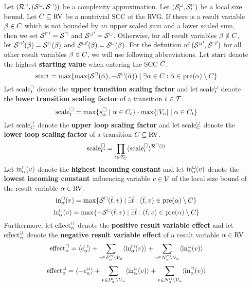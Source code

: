 \begin{theorem}
  Let $({\mathcal{R}^\sqcap}, {({\mathcal{S}^\sqcup}, {\mathcal{S}^\sqcap})})$ be a complexity approximation.
  Let ${({\mathcal{S}^\sqcup_l}, {\mathcal{S}^\sqcap_l})}$ be a local size bound.
  Let $C \subseteq \text{RV}$ be a nontrivial SCC of the RVG.
  If there is a result variable $\beta \in C$ which is not bounded by an upper scaled sum and a lower scaled sum, then we set ${\mathcal{S}^\sqcap}' = {\mathcal{S}^\sqcap}$ and ${\mathcal{S}^\sqcup}' = {\mathcal{S}^\sqcup}$.
  Otherwise, for all result variables $\beta \notin C$, let ${\mathcal{S}^\sqcap}'(\beta) = {\mathcal{S}^\sqcap}(\beta)$ and ${\mathcal{S}^\sqcup}'(\beta) = {\mathcal{S}^\sqcup}(\beta)$.
  For the definition of $({\mathcal{S}^\sqcup}', {\mathcal{S}^\sqcap}')$ for all other result variables $\beta \in C$, we will use following abbreviations.
  Let $\text{start}$ denote the highest \textbf{starting value} when entering the SCC $C$.
  \[ \text{start} = \max \lbrace \max({\mathcal{S}^\sqcap}(\tilde{\alpha}), -{\mathcal{S}^\sqcup}(\tilde{\alpha})) \mid \exists \alpha \in C: \tilde{\alpha} \in \text{pre}(\alpha) \setminus C \rbrace \]
  Let $\text{scale}^\sqcap_t$ denote the \textbf{upper transition scaling factor} and let $\text{scale}^\sqcup_t$ denote the \textbf{lower transition scaling factor} of a transition $t \in \mathcal{T}$.
  \[ \text{scale}^\square_t = \max \lbrace s^\square_{\alpha} \mid \alpha \in C_t \rbrace \cdot \max \lbrace \left|V_\alpha\right| \mid \alpha \in C_t \rbrace \]
  Let $\text{scale}^\sqcap_C$ denote the \textbf{upper loop scaling factor} and let $\text{scale}^\sqcup_C$ denote the \textbf{lower loop scaling factor} of a transition $C \subseteq \text{RV}$.
  \[ \text{scale}^\square_C = \prod_{t \in \mathcal{T}_C} (\text{scale}^\square_t)^{{\mathcal{R}^\sqcap}(t)} \]
  Let $\text{in}^\sqcap_\alpha(v)$ denote the \textbf{highest incoming constant} and let $\text{in}^\sqcup_\alpha(v)$ denote the \textbf{lowest incoming constant} influencing variable $v \in \mathcal{V}$ of the local size bound of the result variable $\alpha \in \text{RV}$.
  \[ \text{in}^\sqcap_\alpha(v) = \max \lbrace {\mathcal{S}^\sqcap}(\tilde{t}, v) \mid \exists \tilde{t}: (\tilde{t}, v) \in \text{pre}(\alpha) \setminus C \rbrace \]
  \[ \text{in}^\sqcup_\alpha(v) = \max \lbrace -{\mathcal{S}^\sqcup}(\tilde{t}, v) \mid \exists \tilde{t}: (\tilde{t}, v) \in \text{pre}(\alpha) \setminus C \rbrace \]
  Furthermore, let $\text{effect}^\sqcap_\alpha$ denote the \textbf{positive result variable effect} and let $\text{effect}^\sqcup_\alpha$ denote the \textbf{negative result variable effect} of a result variable $\alpha \in \text{RV}$.
  \[ \text{effect}^\sqcap_\alpha = \langle e^{\sqcap}_\alpha\rangle + \sum_{v \in P_\alpha^\sqcap \setminus \mathcal{V}_\alpha} \langle\text{in}^\sqcap_\alpha(v)\rangle + \sum_{v \in N_\alpha^\sqcap \setminus \mathcal{V}_\alpha} \langle\text{in}^\sqcup_\alpha(v)\rangle \]
  \[ \text{effect}^\sqcup_\alpha = \langle-e^{\sqcup}_\alpha\rangle + \sum_{v \in P_\alpha^\sqcup \setminus \mathcal{V}_\alpha} \langle\text{in}^\sqcup_\alpha(v)\rangle + \sum_{v \in N_\alpha^\sqcup \setminus \mathcal{V}_\alpha} \langle\text{in}^\sqcap_\alpha(v)\rangle \]

\end{theorem}
